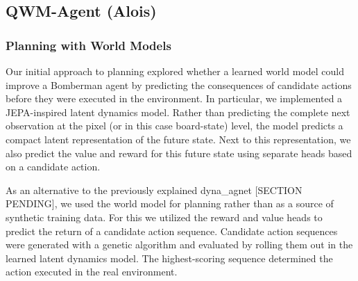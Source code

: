 \documentclass[article, 10pt]{IEEEtran}
\begin{document}
\subsection{QWM-Agent (Alois)}\label{sec:qwm_agent} %

\subsubsection{Planning with World Models}

    






Our initial approach to planning explored whether a learned world model could improve a Bomberman agent by predicting the consequences of candidate actions before they were executed in the environment. In particular, we implemented a JEPA-inspired latent dynamics model. Rather than predicting the complete next observation at the pixel (or in this case board-state) level, the model predicts a compact latent representation of the future state. Next to this representation, we also predict the value and reward for this future state using separate heads based on a candidate action. 

As an alternative to the previously explained dyna\_agnet [SECTION PENDING], we used the world model for planning rather than as a source of synthetic training data. For this we utilized the reward and value heads to predict the return of a candidate action sequence. Candidate action sequences were generated with a genetic algorithm and evaluated by rolling them out in the learned latent dynamics model. The highest-scoring sequence determined the action executed in the real environment. 
\end{document}
